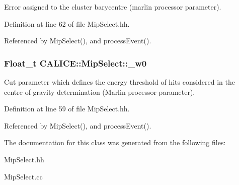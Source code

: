 Error assigned to the cluster barycentre (marlin processor parameter). 



Definition at line 62 of file Mip\-Select.\-hh.



Referenced by Mip\-Select(), and process\-Event().

\subsubsection[{\-\_\-w0}]{\setlength{\rightskip}{0pt plus 5cm}Float\-\_\-t C\-A\-L\-I\-C\-E\-::\-Mip\-Select\-::\-\_\-w0\hspace{0.3cm}{\ttfamily [protected]}}\label{classCALICE_1_1MipSelect_ae601de1184f473e69224607d827436a3}


Cut parameter which defines the energy threshold of hits considered in the centre-\/of-\/gravity determination (Marlin processor parameter). 



Definition at line 59 of file Mip\-Select.\-hh.



Referenced by Mip\-Select(), and process\-Event().



The documentation for this class was generated from the following files\-:\begin{DoxyCompactItemize}
\item 
Mip\-Select.\-hh\item 
Mip\-Select.\-cc\end{DoxyCompactItemize}
